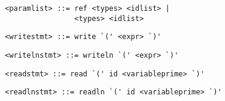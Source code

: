 \begin{footnotesize}
\begin{lstlisting}[frame=single, label={paramlistlist}, language=pie]
<paramlist> ::= ref <types> <idlist> |
                <types> <idlist>
\end{lstlisting}

\begin{lstlisting}[frame=single, label={writestmt}, language=pie]
<writestmt> ::= write `(' <expr> `)'
\end{lstlisting}

\begin{lstlisting}[frame=single, label={writelnstmt}, language=pie]
<writelnstmt> ::= writeln `(' <expr> `)'
\end{lstlisting}

\begin{lstlisting}[frame=single, label={readstmt}, language=pie]
<readstmt> ::= read `(' id <variableprime> `)'
\end{lstlisting}

\begin{lstlisting}[frame=single, label={readlnstmt}, language=pie]
<readlnstmt> ::= readln `(' id <variableprime> `)'
\end{lstlisting}
\end{footnotesize}
